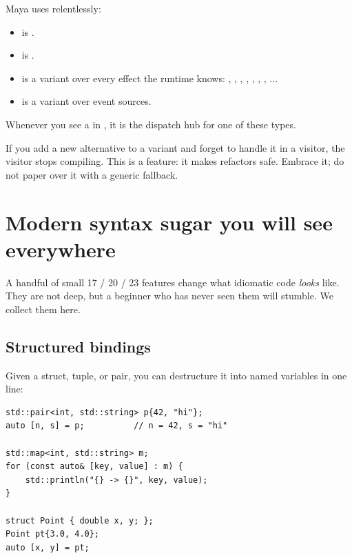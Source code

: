 Maya uses  relentlessly:

\begin{itemize}[leftmargin=*]
  \item {} is
    .
  \item {} is
    .
  \item {} is a variant over every effect the runtime
    knows: , , , ,
    , , , ...
  \item {} is a variant over event sources.
\end{itemize}

Whenever you see a  in \maya{}, it is the dispatch
hub for one of these types.

\begin{warning}
If you add a new alternative to a variant and forget to handle it in
a visitor, the visitor stops compiling. This is a feature: it makes
refactors safe. Embrace it; do not paper over it with a generic
fallback.
\end{warning}

\section{Modern syntax sugar you will see everywhere}
\label{sec:cpp:sugar}

A handful of small \cpp{}17 / 20 / 23 features change what idiomatic
code \emph{looks} like. They are not deep, but a beginner who has
never seen them will stumble. We collect them here.

\subsection{Structured bindings}

Given a struct, tuple, or pair, you can destructure it into named
variables in one line:

\begin{lstlisting}
std::pair<int, std::string> p{42, "hi"};
auto [n, s] = p;          // n = 42, s = "hi"

std::map<int, std::string> m;
for (const auto& [key, value] : m) {
    std::println("{} -> {}", key, value);
}

struct Point { double x, y; };
Point pt{3.0, 4.0};
auto [x, y] = pt;
\end{lstlisting}

